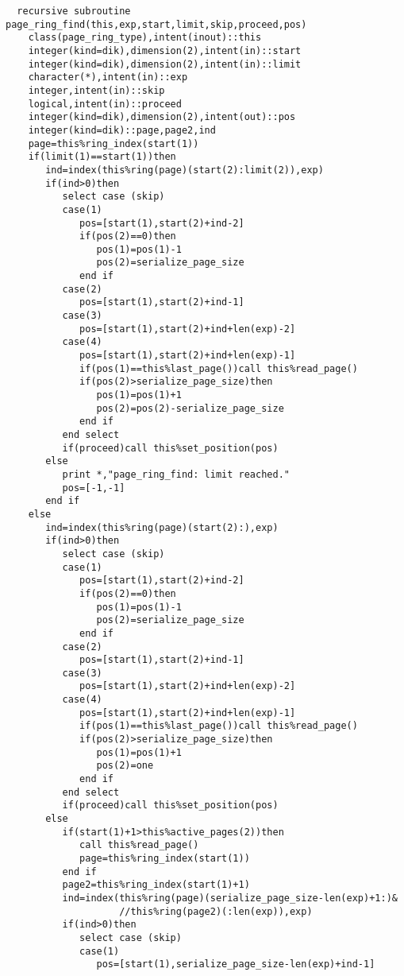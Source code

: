 \begin{Verbatim}
  recursive subroutine page_ring_find(this,exp,start,limit,skip,proceed,pos)
    class(page_ring_type),intent(inout)::this
    integer(kind=dik),dimension(2),intent(in)::start
    integer(kind=dik),dimension(2),intent(in)::limit
    character(*),intent(in)::exp
    integer,intent(in)::skip
    logical,intent(in)::proceed
    integer(kind=dik),dimension(2),intent(out)::pos
    integer(kind=dik)::page,page2,ind
    page=this%ring_index(start(1))
    if(limit(1)==start(1))then
       ind=index(this%ring(page)(start(2):limit(2)),exp)
       if(ind>0)then
          select case (skip)
          case(1)
             pos=[start(1),start(2)+ind-2]
             if(pos(2)==0)then
                pos(1)=pos(1)-1
                pos(2)=serialize_page_size
             end if
          case(2)
             pos=[start(1),start(2)+ind-1]
          case(3)
             pos=[start(1),start(2)+ind+len(exp)-2]
          case(4)
             pos=[start(1),start(2)+ind+len(exp)-1]
             if(pos(1)==this%last_page())call this%read_page()
             if(pos(2)>serialize_page_size)then
                pos(1)=pos(1)+1
                pos(2)=pos(2)-serialize_page_size
             end if
          end select
          if(proceed)call this%set_position(pos)
       else
          print *,"page_ring_find: limit reached."
          pos=[-1,-1]
       end if
    else
       ind=index(this%ring(page)(start(2):),exp)
       if(ind>0)then
          select case (skip)
          case(1)
             pos=[start(1),start(2)+ind-2]
             if(pos(2)==0)then
                pos(1)=pos(1)-1
                pos(2)=serialize_page_size
             end if
          case(2)
             pos=[start(1),start(2)+ind-1]
          case(3)
             pos=[start(1),start(2)+ind+len(exp)-2]
          case(4)
             pos=[start(1),start(2)+ind+len(exp)-1]
             if(pos(1)==this%last_page())call this%read_page()
             if(pos(2)>serialize_page_size)then
                pos(1)=pos(1)+1
                pos(2)=one
             end if
          end select
          if(proceed)call this%set_position(pos)
       else
          if(start(1)+1>this%active_pages(2))then
             call this%read_page()
             page=this%ring_index(start(1))
          end if
          page2=this%ring_index(start(1)+1)
          ind=index(this%ring(page)(serialize_page_size-len(exp)+1:)&
                    //this%ring(page2)(:len(exp)),exp)
          if(ind>0)then
             select case (skip)
             case(1)
                pos=[start(1),serialize_page_size-len(exp)+ind-1]

\end{Verbatim}
